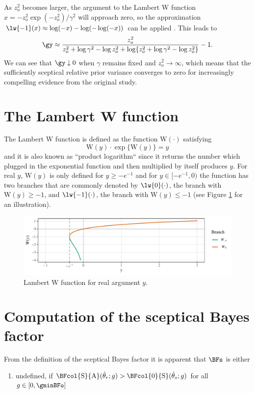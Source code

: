 \begin{subappendices}
As $z_{o}^{2}$ becomes larger, the argument to the Lambert W function
$x = -z_{o}^{2}\exp(-z_{o}^{2})/\gamma^{2}$ will approach zero, so the
approximation $\lw{-1}(x) \approx \log(-x) - \log(-\log(-x))$ can be applied
\citep[p. 350]{Corless1996}. This leads to
\begin{align*}
  \gy \approx \frac{z_{o}^{2}}{z_{o}^{2} + \log \gamma^{2} - \log z_{o}^{2} +
  \log\{z_{o}^{2} + \log \gamma^{2} - \log z_{o}^{2}\}} - 1.
\end{align*}
We can see that $\gy \downarrow 0$ when $\gamma$ remains fixed and
$z_{o}^{2} \to \infty$, which means that the sufficiently sceptical relative
prior variance converges to zero for increasingly compelling evidence from the
original study.

\section{The Lambert W function}
\label{appendix:lambertW}
The Lambert W function \citep{Corless1996} is defined as the function
$\mathrm{W}(\cdot)$ satisfying
$$\mathrm{W}(y) \cdot \exp\{\mathrm{W}(y)\} = y$$
and it is also known as ``product logarithm`` since it returns the number which
plugged in the exponential function and then multiplied by itself produces $y$.
For real $y$, $\mathrm{W}(y)$ is only defined for $y \geq - e^{-1}$ and for
$y \in [-e^{-1}, 0)$ the function has two branches that are commonly denoted by
$\lw{0}(\cdot)$, the branch with $\mathrm{W}(y) \geq -1$, and $\lw{-1}(\cdot)$, the
branch with $\mathrm{W}(y) \leq -1$ (see Figure \ref{fig2:lambertW} for an illustration).
\begin{figure}[!htb]
\begin{knitrout}
\color{fgcolor}
\includegraphics[width=\maxwidth]{images/paper2/plot-Lambert-1}
\end{knitrout}
\caption{Lambert W function for real argument $y$.}
\label{fig2:lambertW}
\end{figure}


\section{Computation of the sceptical Bayes factor}
\label{appendix:bfs}
From the definition of the sceptical Bayes factor it is apparent that $\BFs$ is
either
\begin{enumerate}
  \item \label{undef} undefined,
  if
  $\BFcol{\text{S}}{\text{A}}(\hat{\theta}_r; g) >
  \BFcol{\text{0}}{\text{S}}(\hat{\theta}_o; g)$ for all $g \in [0,
    \gminBFo]$


\end{enumerate}
\end{subappendices}
